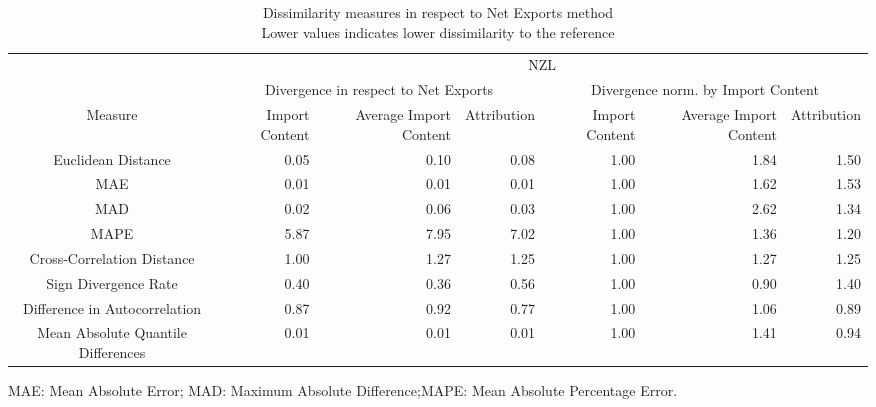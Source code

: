 \begin{table}[t]
\caption*{
{\large Dissimilarity measures in respect to Net Exports method} \\ 
{\small Lower values indicates lower dissimilarity to the reference}
} 
\fontsize{15.0pt}{18.0pt}\selectfont
\begin{tabular*}{\linewidth}{@{\extracolsep{\fill}}crrrrrr}
\toprule
 & \multicolumn{6}{c}{NZL} \\ 
\cmidrule(lr){2-7}
 & \multicolumn{3}{c}{Divergence in respect to Net Exports} & \multicolumn{3}{c}{Divergence norm. by Import Content} \\ 
\cmidrule(lr){2-4} \cmidrule(lr){5-7}
Measure & Import Content & Average Import Content & Attribution & Import Content & Average Import Content & Attribution \\ 
\midrule\addlinespace[2.5pt]
Euclidean Distance & 0.05 & 0.10 & 0.08 & 1.00 & 1.84 & 1.50 \\ 
MAE & 0.01 & 0.01 & 0.01 & 1.00 & 1.62 & 1.53 \\ 
MAD & 0.02 & 0.06 & 0.03 & 1.00 & 2.62 & 1.34 \\ 
MAPE & 5.87 & 7.95 & 7.02 & 1.00 & 1.36 & 1.20 \\ 
Cross-Correlation Distance & 1.00 & 1.27 & 1.25 & 1.00 & 1.27 & 1.25 \\ 
Sign Divergence Rate & 0.40 & 0.36 & 0.56 & 1.00 & 0.90 & 1.40 \\ 
Difference in Autocorrelation & 0.87 & 0.92 & 0.77 & 1.00 & 1.06 & 0.89 \\ 
Mean Absolute Quantile Differences & 0.01 & 0.01 & 0.01 & 1.00 & 1.41 & 0.94 \\ 
\bottomrule
\end{tabular*}
\begin{minipage}{\linewidth}
MAE: Mean Absolute Error; MAD: Maximum Absolute Difference;MAPE: Mean Absolute Percentage Error.\\
\end{minipage}
\end{table}

